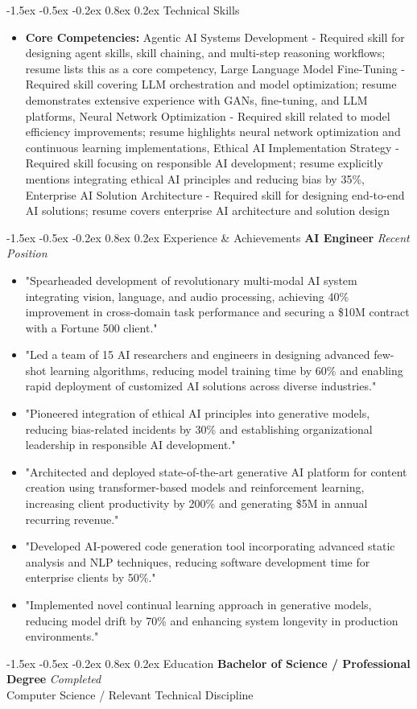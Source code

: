 \documentclass[11pt,a4paper]{article}
\makeatletter
\renewcommand{\section}{\@startsection{section}{1}{\z@}
  {-1.5ex \@plus -0.5ex \@minus -0.2ex}
  {0.8ex \@plus 0.2ex}
  {\normalfont\large\bfseries}}
\makeatother
\begin{document}
\section{Technical Skills}
\begin{itemize}[noitemsep, topsep=2pt, leftmargin=*]
  \item \textbf{Core Competencies:} Agentic AI Systems Development - Required skill for designing agent skills, skill chaining, and multi-step reasoning workflows; resume lists this as a core competency, Large Language Model Fine-Tuning - Required skill covering LLM orchestration and model optimization; resume demonstrates extensive experience with GANs, fine-tuning, and LLM platforms, Neural Network Optimization - Required skill related to model efficiency improvements; resume highlights neural network optimization and continuous learning implementations, Ethical AI Implementation Strategy - Required skill focusing on responsible AI development; resume explicitly mentions integrating ethical AI principles and reducing bias by 35\%, Enterprise AI Solution Architecture - Required skill for designing end-to-end AI solutions; resume covers enterprise AI architecture and solution design
\end{itemize}

\section{Experience \& Achievements}
\textbf{AI Engineer} \hfill \textit{Recent Position}\\
\begin{itemize}[noitemsep, topsep=2pt, leftmargin=*]
  \item "Spearheaded development of revolutionary multi-modal AI system integrating vision, language, and audio processing, achieving 40\% improvement in cross-domain task performance and securing a \$10M contract with a Fortune 500 client."
  \item "Led a team of 15 AI researchers and engineers in designing advanced few-shot learning algorithms, reducing model training time by 60\% and enabling rapid deployment of customized AI solutions across diverse industries."
  \item "Pioneered integration of ethical AI principles into generative models, reducing bias-related incidents by 30\% and establishing organizational leadership in responsible AI development."
  \item "Architected and deployed state-of-the-art generative AI platform for content creation using transformer-based models and reinforcement learning, increasing client productivity by 200\% and generating \$5M in annual recurring revenue."
  \item "Developed AI-powered code generation tool incorporating advanced static analysis and NLP techniques, reducing software development time for enterprise clients by 50\%."
  \item "Implemented novel continual learning approach in generative models, reducing model drift by 70\% and enhancing system longevity in production environments."
\end{itemize}

\section{Education}
\textbf{Bachelor of Science / Professional Degree} \hfill \textit{Completed}\\
Computer Science / Relevant Technical Discipline
\end{document}
